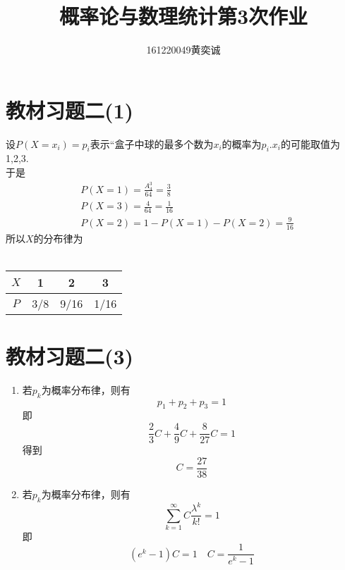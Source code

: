 \documentclass[twocolumn]{article}
\begin{document}
	\begin{CJK}{UTF8}{gbsn}		
			\title{概率论与数理统计第3次作业}
			\author{161220049\quad 黄奕诚}
			\maketitle
			
			\section*{教材习题二(1)}
				设$P(X=x_i)=p_i$表示``盒子中球的最多个数为$x_i$的概率为$p_i$.$x_i$的可能取值为1,2,3.\\
				于是\begin{align*}
					& P(X=1) = \frac{A_4^3}{64}=\frac{3}{8} \\
					& P(X=3) = \frac{4}{64}=\frac{1}{16} \\
					& P(X=2) = 1-P(X=1)-P(X=2)=\frac{9}{16}
				\end{align*}
				所以$X$的分布律为\\ \\
				\begin{tabular}{c|ccc}
					$X$ & 1 & 2 & 3 \\
					\hline
					$P$ & 3/8 & 9/16 & 1/16
				\end{tabular}
			\section*{教材习题二(3)}
				\begin{enumerate}[(1)]
					\item 若$p_k$为概率分布律，则有\[p_1+p_2+p_3 = 1\]即\[\frac{2}{3}C+\frac{4}{9}C+\frac{8}{27}C=1\]得到\[C=\frac{27} {38}\]
					\item 若$p_k$为概率分布律，则有\[\sum_{k=1}^{\infty}C\frac{\lambda^k}{k!}=1\]即\[(e^k-1)C=1\quad C=\frac{1}{e^k-1}\]
				\end{enumerate}

\end{CJK}
\end{document}
